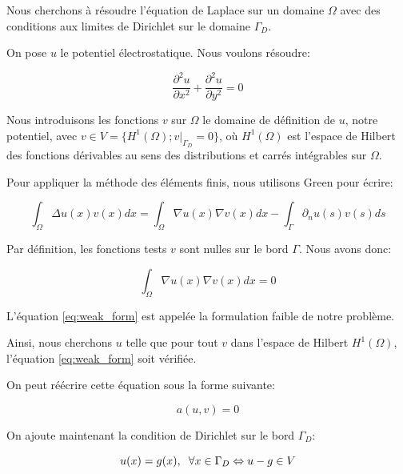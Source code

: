 \documentclass{article}
\begin{document}
\hspace{0.5cm}
Nous cherchons à résoudre l'équation de Laplace sur un domaine $\Omega$ avec des
conditions aux limites de Dirichlet sur le domaine $\Gamma_D$.

On pose $u$ le potentiel électrostatique. Nous voulons résoudre:

\begin{equation}
   \frac{\partial^2 u}{\partial x^2} + \frac{\partial^2 u}{\partial y^2} = 0
\end{equation}

Nous introduisons les fonctions $v$ sur $\Omega$ le domaine de définition de $u$,
notre potentiel, avec $v \in V = \{H^1(\Omega); v|_{\Gamma_D} = 0 \}$, où
$H^1(\Omega)$ est l'espace de Hilbert des fonctions dérivables au sens des
distributions et carrés intégrables sur $\Omega$.

Pour appliquer la méthode des éléments finis, nous utilisons Green
pour écrire:

\begin{equation}
    \int_\Omega \Delta u(x) v(x) dx = \int_\Omega \nabla u(x) \nabla v(x) dx
    - \int_{\Gamma} \partial_n u(s) v(s) ds
\end{equation}

Par définition, les fonctions tests $v$ sont nulles sur le bord $\Gamma$. Nous avons
donc:

\begin{equation}
    \int_\Omega \nabla u(x) \nabla v(x) dx = 0
    \label{eq:weak_form}
\end{equation}

L'équation \ref{eq:weak_form} est appelée la formulation
faible de notre problème.

Ainsi, nous cherchons $u$ telle que pour tout $v$ dans l'espace
de Hilbert $H^1(\Omega)$, l'équation \ref{eq:weak_form} soit vérifiée.

On peut réécrire cette équation sous la forme suivante:

\begin{equation}
    a(u, v) = 0
\end{equation}

On ajoute maintenant la condition de Dirichlet sur le bord $\Gamma_D$:

\begin{equation}
    u(x) = g(x), \hspace{0.2cm} \forall x \in \Gamma_D
    \Leftrightarrow  u-g \in V
\end{equation}
\end{document}
